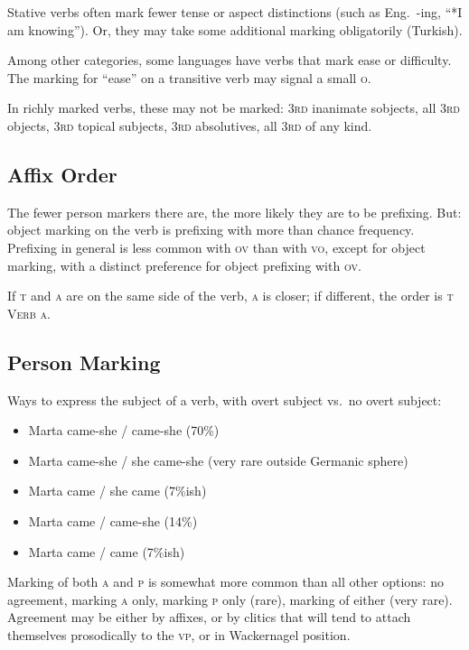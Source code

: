 \documentclass[11pt]{article}
\newcommand{\I}[1]{\textsc{#1}}   %
\newenvironment{grammarlist}%
 {\begin{itemize}\addtolength{\itemsep}{-0.5\baselineskip}\ignorespaces}%
 {\end{itemize}\ignorespacesafterend}
\begin{document}
Stative verbs often mark fewer tense or aspect distinctions (such as
Eng.\ -ing, ``*I am knowing''). Or, they may take some additional
marking obligatorily (Turkish).

Among other categories, some languages have verbs that mark ease or
difficulty.  The marking for ``ease'' on a transitive verb may signal
a small \I{o}.

In richly marked verbs, these may not be marked: \I{3rd} inanimate
sobjects, all \I{3rd} objects, \I{3rd} topical subjects, \I{3rd}
absolutives, all \I{3rd} of any kind.


\subsection{Affix Order}
The fewer person markers there are, the more likely they are to be
prefixing.  But: object marking on the verb is prefixing with more
than chance frequency.  Prefixing in general is less common with
\I{ov} than with \I{vo}, except for object marking, with a distinct
preference for object prefixing with \I{ov}.

If \I{t} and \I{a} are on the same side of the verb, \I{a} is closer;
if different, the order is \I{t Verb a}.

\subsection{Person Marking}
Ways to express the subject of a verb, with overt subject vs.\ no
overt subject:
\begin{grammarlist}
  \item Marta came-she / came-she (70\%)
  \item Marta came-she / she came-she (very rare outside Germanic sphere)
  \item Marta came / she came (7\%ish)
  \item Marta came / came-she (14\%)
  \item Marta came / came (7\%ish)
\end{grammarlist}

Marking of both \I{a} and \I{p} is somewhat more common than all other
options: no agreement, marking \I{a} only, marking \I{p} only (rare),
marking of either (very rare).  Agreement may be either by affixes, or
by clitics that will tend to attach themselves prosodically to the
\I{vp}, or in Wackernagel position.
\end{document}
